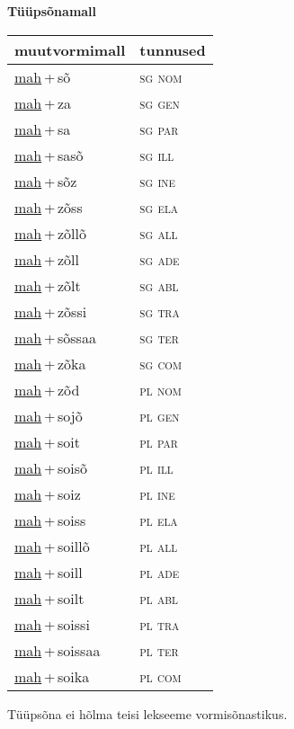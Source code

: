 
\vspace{1.8em}
\begin{minipage}{\textwidth}
\textbf{Tüüpsõnamall \,}\\

\begin{sideways}
\begin{tabular}{l l}
muutvormimall & tunnused \\
\hline
\underline{mah}\,+\,sõ & \textsc{ sg nom } \\
\underline{mah}\,+\,za & \textsc{ sg gen } \\
\underline{mah}\,+\,sa & \textsc{ sg par } \\
\underline{mah}\,+\,sasõ & \textsc{ sg ill } \\
\underline{mah}\,+\,sõz & \textsc{ sg ine } \\
\underline{mah}\,+\,zõss & \textsc{ sg ela } \\
\underline{mah}\,+\,zõllõ & \textsc{ sg all } \\
\underline{mah}\,+\,zõll & \textsc{ sg ade } \\
\underline{mah}\,+\,zõlt & \textsc{ sg abl } \\
\underline{mah}\,+\,zõssi & \textsc{ sg tra } \\
\underline{mah}\,+\,sõssaa & \textsc{ sg ter } \\
\underline{mah}\,+\,zõka & \textsc{ sg com } \\
\underline{mah}\,+\,zõd & \textsc{ pl nom } \\
\underline{mah}\,+\,sojõ & \textsc{ pl gen } \\
\underline{mah}\,+\,soit & \textsc{ pl par } \\
\underline{mah}\,+\,soisõ & \textsc{ pl ill } \\
\underline{mah}\,+\,soiz & \textsc{ pl ine } \\
\underline{mah}\,+\,soiss & \textsc{ pl ela } \\
\underline{mah}\,+\,soillõ & \textsc{ pl all } \\
\underline{mah}\,+\,soill & \textsc{ pl ade } \\
\underline{mah}\,+\,soilt & \textsc{ pl abl } \\
\underline{mah}\,+\,soissi & \textsc{ pl tra } \\
\underline{mah}\,+\,soissaa & \textsc{ pl ter } \\
\underline{mah}\,+\,soika & \textsc{ pl com } \\
\end{tabular}
\end{sideways}
\label{tab:tüüpsõnamall-mahsõ}

\end{minipage}

 
\vspace{1em}
\noindent Tüüpsõna ei hõlma teisi lekseeme vormi\-sõnastikus.
